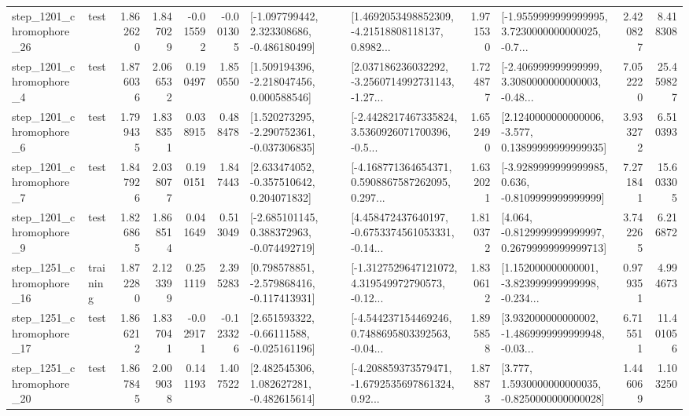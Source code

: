 \begin{tabular}{llrrrrllrlrr}
 step\_1201\_chromophore\_26 &      test &      1.862620 &    1.847029 &     -0.015592 & -0.001305 &   [-1.097799442, 2.323308686, -0.486180499] &  [1.4692053498852309, -4.21518808118137, 0.8982... &       1.971530 &  [-1.9559999999999995, 3.7230000000000025, -0.7... &            2.420827 &          8.418308 \\
  step\_1201\_chromophore\_4 &      test &      1.876036 &    2.066532 &      0.190497 &  1.850550 &    [1.509194396, -2.218047456, 0.000588546] &  [2.037186236032292, -3.2560714992731143, -1.27... &       1.724877 &  [-2.406999999999999, 3.3080000000000003, -0.48... &            7.052220 &         25.459827 \\
  step\_1201\_chromophore\_6 &      test &      1.799435 &    1.838351 &      0.038915 &  0.488478 &   [1.520273295, -2.290752361, -0.037306835] &  [-2.4428217467335824, 3.5360926071700396, -0.5... &       1.652490 &  [2.1240000000000006, -3.577, 0.13899999999999935] &            3.933272 &          6.510393 \\
  step\_1201\_chromophore\_7 &      test &      1.847926 &    2.038077 &      0.190151 &  1.847443 &    [2.633474052, -0.357510642, 0.204071832] &  [-4.168771364654371, 0.5908867587262095, 0.297... &       1.632021 &  [-3.9289999999999985, 0.636, -0.8109999999999999] &            7.271841 &         15.603305 \\
  step\_1201\_chromophore\_9 &      test &      1.826865 &    1.868514 &      0.041649 &  0.513049 &   [-2.685101145, 0.388372963, -0.074492719] &  [4.458472437640197, -0.6753374561053331, -0.14... &       1.810372 &  [4.064, -0.8129999999999997, 0.26799999999999713] &            3.742265 &          6.216872 \\
 step\_1251\_chromophore\_16 &  training &      1.872280 &    2.123399 &      0.251119 &  2.395283 &   [0.798578851, -2.579868416, -0.117413931] &  [-1.3127529647121072, 4.319549972790573, -0.12... &       1.830612 &  [1.152000000000001, -3.823999999999998, -0.234... &            0.979351 &          4.994673 \\
 step\_1251\_chromophore\_17 &      test &      1.866212 &    1.837041 &     -0.029171 & -0.123326 &    [2.651593322, -0.66111588, -0.025161196] &  [-4.544237154469246, 0.7488695803392563, -0.04... &       1.895858 &  [3.932000000000002, -1.4869999999999948, -0.03... &            6.715511 &         11.401056 \\
 step\_1251\_chromophore\_20 &      test &      1.867845 &    2.009038 &      0.141193 &  1.407522 &    [2.482545306, 1.082627281, -0.482615614] &  [-4.208859373579471, -1.6792535697861324, 0.92... &       1.878873 &   [3.777, 1.5930000000000035, -0.8250000000000028] &            1.446069 &          1.103250 \\

\end{tabular}
